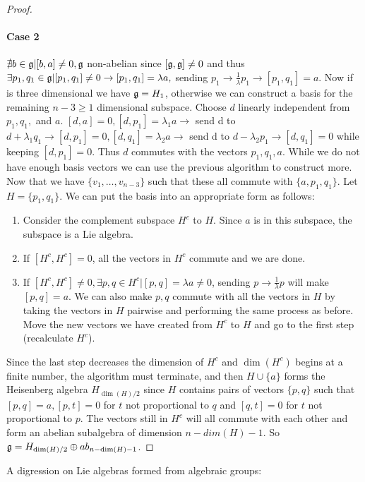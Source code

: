 \documentclass[aps,onecolumn,secnumarabic,nobalancelastpage,amsmath,amssymb]{revtex4}
\begin{document}
\begin{description}
\begin{proof}
\paragraph*{Case 2} $\nexists b \in \mathord{\mathfrak{g}} | [b,a] \ne 0, \mathord{\mathfrak{g}}$ non-abelian since $[\mathord{\mathfrak{g}},\mathord{\mathfrak{g}}] \ne 0$ and thus $\exists p_1,q_1 \in \mathord{\mathfrak{g}} | [p_1,q_1] \ne 0 \rightarrow [p_1,q_1] = \lambda a,$ sending $p_1 \rightarrow \frac{1}{\lambda}p_1 \rightarrow [p_1,q_1] = a$.  Now if {\g} is three dimensional we have $\mathord{\mathfrak{g}} = H_1$, otherwise we can construct a basis for the remaining $n-3 \ge 1$ dimensional subspace.  Choose $d$ linearly independent from $p_1, q_1,$ and $a$.  $[d,a] = 0, [d,p_1] = \lambda_1 a \rightarrow$ send d to $d + \lambda_1 q_1 \rightarrow [d,p_1] = 0, [d,q_1] = \lambda_2 a \rightarrow$ send d to $d - \lambda_2 p_1 \rightarrow [d,q_1] = 0$ while keeping $[d,p_1] = 0$. Thus $d$ commutes with the vectors $p_1,q_1,a$. While we do not have enough basis vectors we can use the previous algorithm to construct more.  Now that we have $\{v_1,\ldots,v_{n-3}\}$ such that these all commute with $\{a,p_1,q_1\}$.  Let $H = \{p_1,q_1\}$.  We can put the basis into an appropriate form as follows:

\renewcommand{\labelenumi}{\arabic{enumi}.}
\begin{enumerate}
\item Consider the complement subspace $H^c$ to $H$. Since $a$ is in this subspace, the subspace is a Lie algebra.
\item If $[H^c,H^c] = 0$, all the vectors in $H^c$ commute and we are done.
\item If $[H^c,H^c] \ne 0, \exists p,q \in H^c | [p,q] = \lambda a \ne 0$, sending $p \rightarrow \frac{1}{\lambda}p$ will make $[p,q] = a$. We can also make $p,q$ commute with all the vectors in $H$ by taking the vectors in $H$ pairwise and performing the same process as before.  Move the new vectors we have created from $H^c$ to $H$ and go to the first step (recalculate $H^c$).
\end{enumerate}
\renewcommand{\labelenumi}{\alph{enumi})}

Since the last step decreases the dimension of $H^c$ and $\dim(H^c)$ begins at a finite number, the algorithm must terminate, and then $H \cup \{a\}$ forms the Heisenberg algebra $H_{\dim(H)/2}$ since $H$ contains pairs of vectors $\{p,q\}$ such that $[p,q] = a, [p,t] = 0$ for $t$ not proportional to $q$ and $[q,t] = 0$ for $t$ not proportional to $p$.  The vectors still in $H^c$ will all commute with each other and form an abelian subalgebra of dimension $n-dim(H)-1$. So $\mathord{\mathfrak{g}} = H_{\dim(H)/2} \oplus ab_{n-\dim(H)-1}$. 
\end{proof}
\end{description}
A digression on Lie algebras formed from algebraic groups: 
\end{document}

